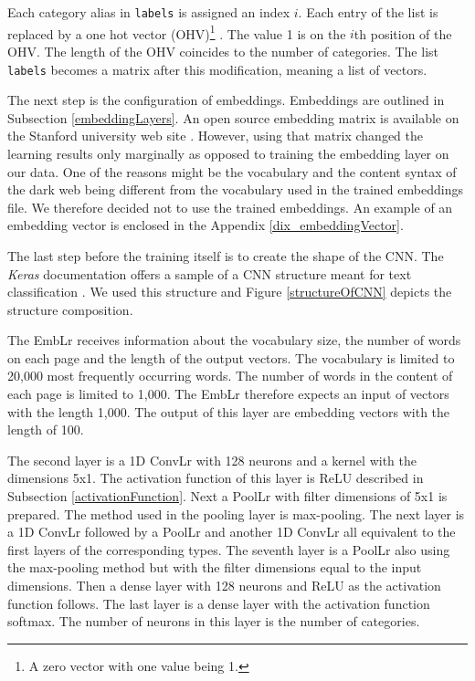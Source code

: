 Each category alias in \texttt{labels} is assigned an index $i$. Each entry of the list is replaced by a one hot vector (OHV)\footnote{A zero vector with one value being 1.} . The value 1 is on the $i$th position of the OHV. The length of the OHV coincides to the number of categories. The list \texttt{labels} becomes a matrix after this modification, meaning a list of vectors.

The next step is the configuration of embeddings. Embeddings are outlined in Subsection \ref{embeddingLayers}. An open source embedding matrix is available on the Stanford university web site \cite{embeddings}. However, using that matrix changed the learning results only marginally as opposed to training the embedding layer on our data. One of the reasons might be the vocabulary and the content syntax of the dark web being different from the vocabulary used in the trained embeddings file. We therefore decided not to use the trained embeddings. An example of an embedding vector is enclosed in the Appendix \ref{dix_embeddingVector}.

The last step before the training itself is to create the shape of the CNN. The \textit{Keras} documentation offers a sample of a CNN structure meant for text classification \cite{kerasCNNStructure}. We used this structure and Figure \ref{structureOfCNN} depicts the structure composition. 

The EmbLr receives information about the vocabulary size, the number of words on each page and the length of the output vectors. The vocabulary is limited to 20,000 most frequently occurring words. The number of words in the content of each page is limited to 1,000. The EmbLr therefore expects an input of vectors with the length 1,000. The output of this layer are embedding vectors with the length of 100. 

The second layer is a 1D ConvLr with 128 neurons and a kernel with the dimensions 5x1. The activation function of this layer is ReLU described in Subsection \ref{activationFunction}. Next a PoolLr with filter dimensions of 5x1 is prepared. The method used in the pooling layer is max-pooling. The next layer is a 1D ConvLr followed by a PoolLr and another 1D ConvLr all equivalent to the first layers of the corresponding types. The seventh layer is a PoolLr also using the max-pooling method but with the filter dimensions equal to the input dimensions. Then a dense layer with 128 neurons and ReLU as the activation function follows. The last layer is a dense layer with the activation function softmax. The number of neurons in this layer is the number of categories.

